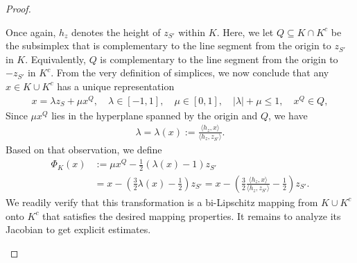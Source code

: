 \documentclass[10pt,a4paper]{article}
\begin{document}
\begin{proof}
\begin{itemize}
        Once again, $h_{z}$ denotes the height of $z_{S'}$ within $K$.
        Here, we let $Q \subseteq K \cap K^{c}$ be the subsimplex 
        that is complementary to the line segment from the origin to $z_{S'}$ in $K$.
        Equivalently, $Q$ is complementary to the line segment from the origin to $-z_{S'}$ in $K^{c}$.
        From the very definition of simplices, we now conclude that any $x \in K \cup K^{c}$ 
        has a unique representation
        \begin{align*}
            x = \lambda z_{S} + \mu x^{Q}, \quad \lambda \in [-1,1], \quad \mu \in [0,1], \quad |\lambda| + \mu \leq 1, \quad x^{Q} \in Q,
        \end{align*}
        Since $\mu x^{Q}$ lies in the hyperplane spanned by the origin and $Q$, we have 
        \begin{align*}
            \lambda = \lambda(x) := \frac{\langle h_{z},x\rangle}{\langle h_{z},z_{S'}\rangle} 
            .
        \end{align*}
        Based on that observation, we define 
        \begin{align*}
            \Phi_{K}(x) 
			&
			:= 
            \mu x^{Q} - \frac 1 2 \left( \lambda(x) - 1 \right) z_{S'}
            \\&
            = 
            x - \left( \frac 3 2 \lambda(x) - \frac 1 2 \right) z_{S'}
            = 
            x - \left( \frac 3 2 \frac{\langle h_{z},x\rangle}{\langle h_{z},z_{S'}\rangle} - \frac 1 2 \right) z_{S'}
            .
        \end{align*}
        We readily verify that this transformation is a bi-Lipschitz mapping from $K \cup K^{c}$ onto $K^{c}$
        that satisfies the desired mapping properties. 
        It remains to analyze its Jacobian to get explicit estimates. 
        

\end{itemize}
\end{proof}
\end{document}
